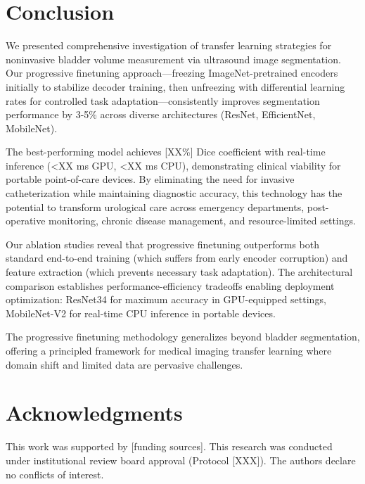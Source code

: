 \documentclass{article}
\begin{document}
\section{Conclusion}

We presented comprehensive investigation of transfer learning strategies for noninvasive bladder volume measurement via ultrasound image segmentation. Our progressive finetuning approach—freezing ImageNet-pretrained encoders initially to stabilize decoder training, then unfreezing with differential learning rates for controlled task adaptation—consistently improves segmentation performance by 3-5\% across diverse architectures (ResNet, EfficientNet, MobileNet).

The best-performing model achieves [XX\%] Dice coefficient with real-time inference (<XX ms GPU, <XX ms CPU), demonstrating clinical viability for portable point-of-care devices. By eliminating the need for invasive catheterization while maintaining diagnostic accuracy, this technology has the potential to transform urological care across emergency departments, post-operative monitoring, chronic disease management, and resource-limited settings.

Our ablation studies reveal that progressive finetuning outperforms both standard end-to-end training (which suffers from early encoder corruption) and feature extraction (which prevents necessary task adaptation). The architectural comparison establishes performance-efficiency tradeoffs enabling deployment optimization: ResNet34 for maximum accuracy in GPU-equipped settings, MobileNet-V2 for real-time CPU inference in portable devices.

The progressive finetuning methodology generalizes beyond bladder segmentation, offering a principled framework for medical imaging transfer learning where domain shift and limited data are pervasive challenges.

\section*{Acknowledgments}

This work was supported by [funding sources]. This research was conducted under institutional review board approval (Protocol [XXX]). The authors declare no conflicts of interest.
\end{document}
